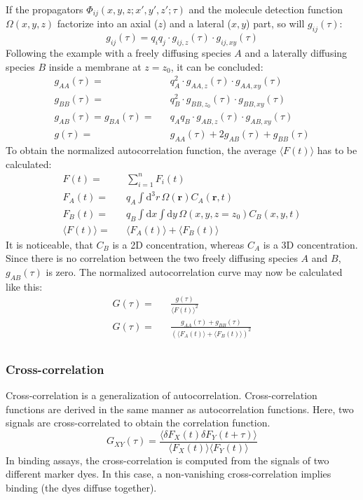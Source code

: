 	If the propagators $\Phi_{ij}(x,y,z; x',y',z'; \tau)$ and the molecule detection function $\Omega(x,y,z)$ factorize into an axial ($z$) and a lateral ($x,y$) part, so will $g_{ij}(\tau)$:
	\begin{equation}
	g_{ij}(\tau) = q_i q_j \cdot g_{ij,z}(\tau) \cdot g_{ij,xy}(\tau)
	\end{equation}
	Following the example with a freely diffusing species $A$ and a laterally diffusing species $B$ inside a membrane at $z = z_0$, it can be concluded:
	\begin{eqnarray*}
	g_{AA}(\tau) = && q_A^2 \cdot g_{AA,z}(\tau) \cdot g_{AA,xy}(\tau) \\
	g_{BB}(\tau) = && q_B^2 \cdot g_{BB,z_0}(\tau) \cdot g_{BB,xy}(\tau) \\
	g_{AB}(\tau) = g_{BA} (\tau) = && q_A q_B \cdot g_{AB,z}(\tau) \cdot g_{AB,xy}(\tau)  \\
	g(\tau) = && g_{AA}(\tau) + 2 g_{AB}(\tau) + g_{BB}(\tau)
	\end{eqnarray*}
	To obtain the normalized autocorrelation function, the average $\langle F(t) \rangle$ has to be calculated:
	\begin{eqnarray*}
	F(t) = && \sum_{i=1}^n F_i(t) \\
	F_A(t) = && q_A \int \! \mathrm{d}^3 r \, \Omega(\mathbf{r}) C_A(\mathbf{r}, t) \\
	F_B(t) = && q_B \int \! \mathrm{d}x \! \int \! \mathrm{d}y \, \Omega(x,y,z=z_0) C_B(x,y, t)  \\
	\langle F(t) \rangle = && \langle F_A(t) \rangle + \langle F_B(t) \rangle
	\end{eqnarray*}
	It is noticeable, that $C_B$ is a 2D concentration, whereas $C_A$ is a 3D concentration. Since there is no correlation between the two freely diffusing species $A$ and $B$, $g_{AB}(\tau)$ is zero. The normalized autocorrelation curve may now be calculated like this:
	\begin{eqnarray*}
	G(\tau) = && \frac{g(\tau)}{\langle F(t) \rangle^2} \\
	G(\tau) = && \frac{g_{AA}(\tau) + g_{BB}(\tau)}{(\langle F_A(t) \rangle + \langle F_B(t) \rangle)^2} \\
	\end{eqnarray*}

	\subsubsection{Cross-correlation}
	Cross-correlation is a generalization of autocorrelation. Cross-correlation functions are derived in the same manner as autocorrelation functions. Here, two signals are cross-correlated to obtain the correlation function.
	\begin{equation}
	G_{XY}(\tau) = \frac{\langle \delta F_X(t) \delta F_Y(t+\tau) \rangle}{\langle F_X(t) \rangle \langle F_Y(t) \rangle}
	\end{equation}
	In binding assays, the cross-correlation is computed from the signals of two different marker dyes. In this case, a non-vanishing cross-correlation implies binding (the dyes diffuse together).
	
